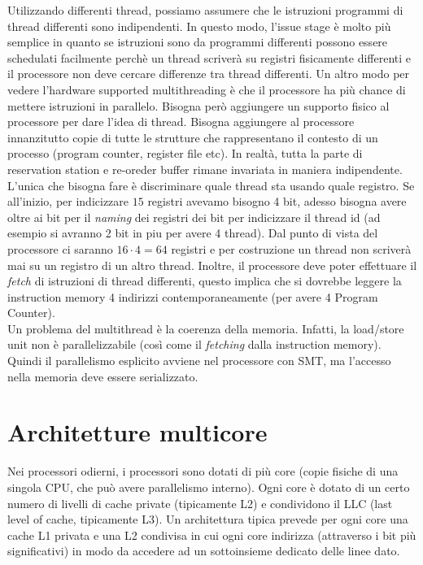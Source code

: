 \documentclass{article}
\begin{document}
Utilizzando differenti thread, possiamo assumere che le istruzioni programmi di thread differenti sono indipendenti. In questo modo, l'issue stage è molto più semplice in quanto se istruzioni sono da programmi differenti possono essere schedulati facilmente perchè un thread scriverà su registri fisicamente differenti e il processore non deve cercare differenze tra thread differenti. Un altro modo per vedere l'hardware supported multithreading è che il processore ha più chance di mettere istruzioni in parallelo. Bisogna però aggiungere un supporto fisico al processore per dare l'idea di thread. Bisogna aggiungere al processore innanzitutto copie di tutte le strutture che rappresentano il contesto di un processo (program counter, register file etc). In realtà, tutta la parte di reservation station e re-oreder buffer rimane invariata in maniera indipendente. L'unica che bisogna fare è discriminare quale thread sta usando quale registro. Se all'inizio, per indicizzare $15$ registri avevamo bisogno 4 bit, adesso bisogna avere oltre ai bit per il \textit{naming} dei registri dei bit per indicizzare il thread id (ad esempio si avranno 2 bit in piu per avere 4 thread). Dal punto di vista del processore ci saranno $16\cdot4 = 64$ registri e per costruzione un thread non scriverà mai su un registro di un altro thread. Inoltre, il processore deve poter effettuare il \textit{fetch} di istruzioni di thread differenti, questo implica che si dovrebbe leggere la instruction memory 4 indirizzi contemporaneamente (per avere 4 Program Counter).\\
Un problema del multithread è la coerenza della memoria. Infatti, la load/store unit non è parallelizzabile (così come il \textit{fetching} dalla instruction memory). Quindi il parallelismo esplicito avviene nel processore con SMT, ma l'accesso nella memoria deve essere serializzato.

\section{Architetture multicore}
Nei processori odierni, i processori sono dotati di più core (copie fisiche di una singola CPU, che può avere parallelismo interno). Ogni core è dotato di un certo numero di livelli di cache private (tipicamente L2) e condividono il LLC (last level of cache, tipicamente L3). Un architettura tipica prevede per ogni core una cache L1 privata e una L2 condivisa in cui ogni core indirizza (attraverso i bit più significativi) in modo da accedere ad un sottoinsieme dedicato delle linee dato.
\end{document}
